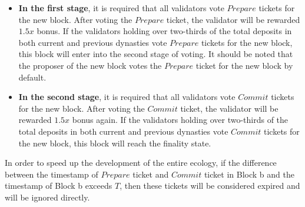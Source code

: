 
\begin{itemize}

\item \textbf{In the first stage}, it is required that all validators vote $Prepare$ tickets for the new block. After voting the $Prepare$ ticket, the validator will be rewarded $1.5x$ bonus. If the validators holding over two-thirds of the total deposits in both current and previous dynasties vote $Prepare$ tickets for the new block, this block will enter into the second stage of voting. It should be noted that the proposer of the new block votes the $Prepare$ ticket for the new block by default.


\item \textbf{In the second stage}, it is required that all validators vote $Commit$ tickets for the new block. After voting the $Commit$ ticket, the validator will be rewarded $1.5x$ bonus again. If the validators holding over two-thirds of the total deposits in both current and previous dynasties vote $Commit$ tickets for the new block, this block will reach the finality state.

\end{itemize}

In order to speed up the development of the entire ecology, if the difference between the timestamp of $Prepare$ ticket and $Commit$ ticket in Block b and the timestamp of Block b exceeds $T$, then these tickets will be considered expired and will be ignored directly.


